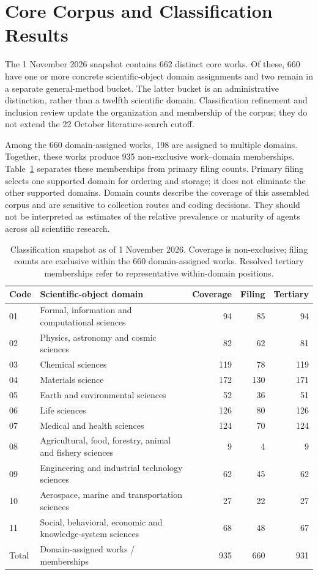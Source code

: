 \section{Core Corpus and Classification Results}
\label{sec:corpus}

The 1 November 2026 snapshot contains 662 distinct core works. Of these, 660 have one or more concrete scientific-object domain assignments and two remain in a separate general-method bucket. The latter bucket is an administrative distinction, rather than a twelfth scientific domain. Classification refinement and inclusion review update the organization and membership of the corpus; they do not extend the 22 October literature-search cutoff.

Among the 660 domain-assigned works, 198 are assigned to multiple domains. Together, these works produce 935 non-exclusive work--domain memberships. Table~\ref{tab:corpuscounts} separates these memberships from primary filing counts. Primary filing selects one supported domain for ordering and storage; it does not eliminate the other supported domains. Domain counts describe the coverage of this assembled corpus and are sensitive to collection routes and coding decisions. They should not be interpreted as estimates of the relative prevalence or maturity of agents across all scientific research.

\begin{table}[H]
\caption{Classification snapshot as of 1 November 2026. Coverage is non-exclusive; filing counts are exclusive within the 660 domain-assigned works. Resolved tertiary memberships refer to representative within-domain positions.}
\label{tab:corpuscounts}
\small
\begin{tabularx}{\textwidth}{@{}p{}>{\raggedright\arraybackslash}Xrrr@{}}
\toprule
Code & Scientific-object domain & Coverage & Filing & Tertiary \\
\midrule
01 & Formal, information and computational sciences & 94 & 85 & 94 \\
02 & Physics, astronomy and cosmic sciences & 82 & 62 & 81 \\
03 & Chemical sciences & 119 & 78 & 119 \\
04 & Materials science & 172 & 130 & 171 \\
05 & Earth and environmental sciences & 52 & 36 & 51 \\
06 & Life sciences & 126 & 80 & 126 \\
07 & Medical and health sciences & 124 & 70 & 124 \\
08 & Agricultural, food, forestry, animal and fishery sciences & 9 & 4 & 9 \\
09 & Engineering and industrial technology sciences & 62 & 45 & 62 \\
10 & Aerospace, marine and transportation sciences & 27 & 22 & 27 \\
11 & Social, behavioral, economic and knowledge-system sciences & 68 & 48 & 67 \\
\midrule
Total & Domain-assigned works / memberships & 935 & 660 & 931 \\
\bottomrule
\end{tabularx}
\end{table}

